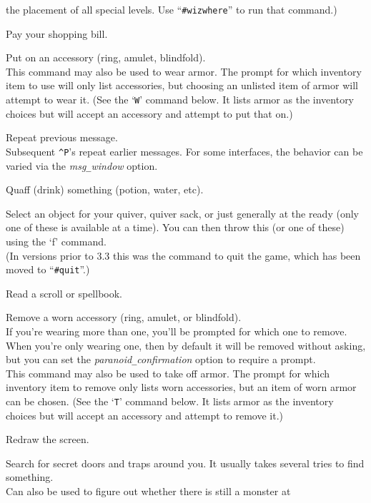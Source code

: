 the placement of all special levels.
Use ``{\tt \#wizwhere}'' to run that command.)
\item[\tb{p}]
Pay your shopping bill.
\item[\tb{P}]
Put on an accessory (ring, amulet, blindfold).\\
This command may also be used to wear armor.  The prompt for
which inventory item to use will only list accessories, but choosing
an unlisted item of armor will attempt to wear it.
(See the `{\tt W}' command below.  It lists armor as the inventory
choices but will accept an accessory and attempt to put that on.)
\item[\tb{\^{}P}]
Repeat previous message.\\
Subsequent {\tt \^{}P}'s repeat earlier messages.
For some interfaces, the behavior can be varied via the
{\it msg\verb+_+window\/} option.
\item[\tb{q}]
Quaff (drink) something (potion, water, etc).
\item[\tb{Q}]
Select an object for your quiver, quiver sack, or just generally at
the ready (only one of these is available at a time).  You can then throw
this (or one of these) using
the `f' command.\\
(In versions prior to 3.3 this was the command to quit
the game, which has been moved to ``{\tt \#quit}''.)
\item[\tb{r}]
Read a scroll or spellbook.
\item[\tb{R}]
Remove a worn accessory (ring, amulet, or blindfold).\\
If you're wearing more than one, you'll be prompted for which one to
remove.  When you're only wearing one, then by default it will be removed
without asking, but you can set the
{\it paranoid\verb+_+confirmation\/}
option to require a prompt.\\
This command may also be used to take off armor.  The prompt for which
inventory item to remove only lists worn accessories, but an item of
worn armor can be chosen.
(See the `{\tt T}' command below.  It lists armor as the inventory
choices but will accept an accessory and attempt to remove it.)
\item[\tb{\^{}R}]
Redraw the screen.
\item[\tb{s}]
Search for secret doors and traps around you.
It usually takes several tries to find something.\\
Can also be used to figure out whether there is still a monster at
